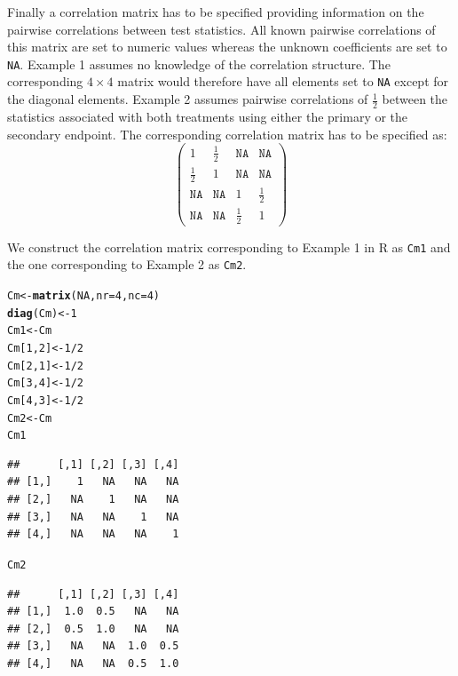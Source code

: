 \documentclass[a4paper, 11pt]{article}\usepackage[]{graphicx}\usepackage[]{color}
\makeatletter
\newcommand{\hlnum}[1]{\textcolor[rgb]{0.686,0.059,0.569}{#1}}%
\newcommand{\hlopt}[1]{\textcolor[rgb]{0,0,0}{#1}}%
\newcommand{\hlstd}[1]{\textcolor[rgb]{0.345,0.345,0.345}{#1}}%
\newcommand{\hlkwb}[1]{\textcolor[rgb]{0.69,0.353,0.396}{#1}}%
\newcommand{\hlkwc}[1]{\textcolor[rgb]{0.333,0.667,0.333}{#1}}%
\newcommand{\hlkwd}[1]{\textcolor[rgb]{0.737,0.353,0.396}{\textbf{#1}}}%
\newenvironment{kframe}{%
 \def\at@end@of@kframe{}%
 \ifinner\ifhmode%
  \def\at@end@of@kframe{\end{minipage}}%
  \begin{minipage}{\columnwidth}%
 \fi\fi%
 \def\FrameCommand##1{\hskip\@totalleftmargin \hskip-\fboxsep
 \colorbox{shadecolor}{##1}\hskip-\fboxsep
     \hskip-\linewidth \hskip-\@totalleftmargin \hskip\columnwidth}%
 \MakeFramed {\advance\hsize-\width
   \@totalleftmargin\z@ \linewidth\hsize
   \@setminipage}}%
 {\par\unskip\endMakeFramed%
 \at@end@of@kframe}
\newenvironment{knitrout}{}{} %
\makeatother
\begin{document}
Finally a correlation matrix has to be specified providing
information on the pairwise correlations between test statistics. All
known pairwise correlations of this matrix are set to numeric values
whereas the unknown coefficients are set to \texttt{NA}. Example 1
assumes no knowledge of the correlation structure. The corresponding
$4\times 4$ matrix would therefore have all elements set to
\texttt{NA} except for the diagonal elements. Example 2 assumes
pairwise correlations of  $\frac{1}{2}$ between the statistics
associated with both treatments using either the primary or the
secondary endpoint. The corresponding correlation matrix has to be
specified as: 
\begin{displaymath}
  \left( \begin{array}{cccc}
      1 & \frac{1}{2} & \texttt{NA} & \texttt{NA} \\
      \frac{1}{2} & 1 & \texttt{NA} & \texttt{NA} \\
      \texttt{NA} & \texttt{NA} & 1 & \frac{1}{2} \\
      \texttt{NA} & \texttt{NA} & \frac{1}{2} & 1
    \end{array} \right)
\end{displaymath}

We construct the correlation matrix corresponding to Example 1 in R as
\texttt{Cm1} and the one corresponding to Example 2 as \texttt{Cm2}. 

\begin{knitrout}
\color{fgcolor}\begin{kframe}
\begin{alltt}
\hlstd{Cm} \hlkwb{<-} \hlkwd{matrix}\hlstd{(}\hlnum{NA}\hlstd{,} \hlkwc{nr} \hlstd{=} \hlnum{4}\hlstd{,} \hlkwc{nc} \hlstd{=} \hlnum{4}\hlstd{)}
\hlkwd{diag}\hlstd{(Cm)} \hlkwb{<-} \hlnum{1}
\hlstd{Cm1} \hlkwb{<-} \hlstd{Cm}
\hlstd{Cm[}\hlnum{1}\hlstd{,} \hlnum{2}\hlstd{]} \hlkwb{<-} \hlnum{1}\hlopt{/}\hlnum{2}
\hlstd{Cm[}\hlnum{2}\hlstd{,} \hlnum{1}\hlstd{]} \hlkwb{<-} \hlnum{1}\hlopt{/}\hlnum{2}
\hlstd{Cm[}\hlnum{3}\hlstd{,} \hlnum{4}\hlstd{]} \hlkwb{<-} \hlnum{1}\hlopt{/}\hlnum{2}
\hlstd{Cm[}\hlnum{4}\hlstd{,} \hlnum{3}\hlstd{]} \hlkwb{<-} \hlnum{1}\hlopt{/}\hlnum{2}
\hlstd{Cm2} \hlkwb{<-} \hlstd{Cm}
\hlstd{Cm1}
\end{alltt}
\begin{verbatim}
##      [,1] [,2] [,3] [,4]
## [1,]    1   NA   NA   NA
## [2,]   NA    1   NA   NA
## [3,]   NA   NA    1   NA
## [4,]   NA   NA   NA    1
\end{verbatim}
\begin{alltt}
\hlstd{Cm2}
\end{alltt}
\begin{verbatim}
##      [,1] [,2] [,3] [,4]
## [1,]  1.0  0.5   NA   NA
## [2,]  0.5  1.0   NA   NA
## [3,]   NA   NA  1.0  0.5
## [4,]   NA   NA  0.5  1.0
\end{verbatim}
\end{kframe}
\end{knitrout}
\end{document}
